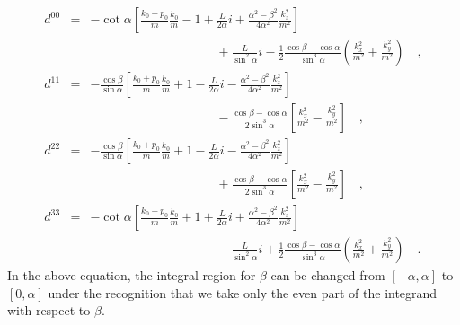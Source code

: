 \begin{eqnarray}
d^{00} & = & - \cot \alpha \left [\frac{k_{0} + p_{0}}{m}\frac{k_{0}}{m} - 1
+
\frac{L}{2 \alpha} i +  \frac{\alpha ^{2} - \beta ^{2}}{4 \alpha
^{2}}
\frac{k_{z}^{2}}{m^{2}} \right ] \nonumber \\
&& \qquad \qquad \qquad \qquad \qquad + \frac{L}{\sin ^{2} \alpha} i
- \frac{1}{2} \frac{\cos \beta - \cos \alpha}{\sin ^{3} \alpha }
\left ( \frac{k_{x}^{2}}{m^{2}} + \frac{k_{y}^{2}}{m^{2}} \right )
\quad , \\
d^{11} & = & - \frac{\cos \beta}{\sin \alpha} \left [
\frac{k_{0} + p_{0}}{m} \frac{k_{0}}{m} + 1 - \frac{L}{2 \alpha} i
- \frac{\alpha ^{2} - \beta ^{2}}{4 \alpha ^{2}} \frac{k_{z}^{2}}{m^{2}}
\right ]
\nonumber \\ && \qquad \qquad \qquad \qquad \qquad - \frac{\cos \beta - \cos
\alpha }
{2 \sin ^{3} \alpha} \left [ \frac{k_{x}^{2}}{m^{2}}
- \frac{k_{y}^{2}}{m^{2}} \right ] \quad , \\
d^{22} & = & - \frac{\cos \beta}{\sin \alpha} \left [
\frac{k_{0} + p_{0}}{m} \frac{k_{0}}{m} + 1 - \frac{L}{2 \alpha} i
- \frac{\alpha ^{2} - \beta ^{2}}{4 \alpha ^{2}} \frac{k_{z}^{2}}{m^{2}}
\right ]
\nonumber \\ && \qquad \qquad \qquad \qquad \qquad + \frac{\cos \beta - \cos
\alpha }
{2 \sin ^{3} \alpha} \left [ \frac{k_{x}^{2}}{m^{2}}
- \frac{k_{y}^{2}}{m^{2}} \right ] \quad , \\
d^{33} & = & - \cot \alpha \left [\frac{k_{0} + p_{0}}{m}\frac{k_{0}}{m} + 1
+
\frac{L}{2 \alpha} i  + \frac{\alpha ^{2} - \beta ^{2}}{4 \alpha
^{2}}
\frac{k_{z}^{2}}{m^{2}} \right ] \nonumber \\
&& \qquad \qquad \qquad \qquad \qquad - \frac{L}{\sin ^{2} \alpha} i
+ \frac{1}{2} \frac{\cos \beta - \cos \alpha}{\sin ^{3} \alpha }
\left ( \frac{k_{x}^{2}}{m^{2}} + \frac{k_{y}^{2}}{m^{2}} \right )
\quad .
\label{eq:eqdmn}
\end{eqnarray}
In the above equation, the integral region for $\beta$ can be changed from
$[-\alpha , \alpha]$ to $[0, \alpha]$ under the recognition that we take
only the even part of the integrand with respect to $\beta$.

